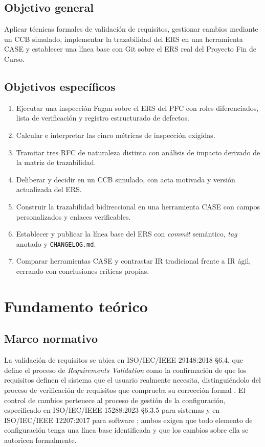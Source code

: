 \documentclass[11pt,letterpaper]{article}
\begin{document}
\subsection*{Objetivo general}
Aplicar técnicas formales de validación de requisitos, gestionar cambios mediante un CCB simulado, implementar la trazabilidad del ERS en una herramienta CASE y establecer una línea base con Git sobre el ERS real del Proyecto Fin de Curso.

\subsection*{Objetivos específicos}
\begin{enumerate}[leftmargin=*,itemsep=1pt]
\item Ejecutar una inspección Fagan sobre el ERS del PFC con roles diferenciados, lista de verificación y registro estructurado de defectos.
\item Calcular e interpretar las cinco métricas de inspección exigidas.
\item Tramitar tres RFC de naturaleza distinta con análisis de impacto derivado de la matriz de trazabilidad.
\item Deliberar y decidir en un CCB simulado, con acta motivada y versión actualizada del ERS.
\item Construir la trazabilidad bidireccional en una herramienta CASE con campos personalizados y enlaces verificables.
\item Establecer y publicar la línea base del ERS con \emph{commit} semántico, \emph{tag} anotado y \texttt{CHANGELOG.md}.
\item Comparar herramientas CASE y contrastar IR tradicional frente a IR ágil, cerrando con conclusiones críticas propias.
\end{enumerate}

\section{Fundamento teórico}

\subsection{Marco normativo}
La validación de requisitos se ubica en ISO/IEC/IEEE 29148:2018 \S6.4, que define el proceso de \emph{Requirements Validation} como la confirmación de que los requisitos definen el sistema que el usuario realmente necesita, distinguiéndolo del proceso de verificación de requisitos que comprueba su corrección formal \cite{iso29148}. El control de cambios pertenece al proceso de gestión de la configuración, especificado en ISO/IEC/IEEE 15288:2023 \S6.3.5 para sistemas y en ISO/IEC/IEEE 12207:2017 para software \cite{iso15288,iso12207}; ambos exigen que todo elemento de configuración tenga una línea base identificada y que los cambios sobre ella se autoricen formalmente.
\end{document}
